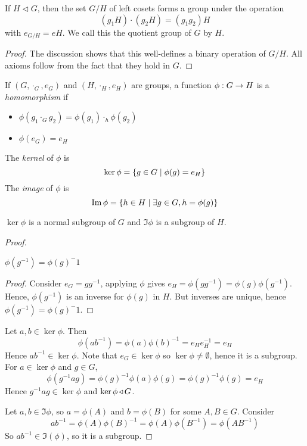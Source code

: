 \documentclass{article}
\begin{document}
\begin{prop}
    If $H \triangleleft G$, then the set $G / H$ of left cosets forms a group under the operation $$ (g_1H) \cdot (g_2H) = (g_1g_2) H $$ with $e_{G / H} = eH$.
    We call this the quotient group of $G$ by $H$.
\end{prop}
\begin{proof}
    The discussion shows that this well-defines a binary operation of $G / H$. All axioms follow from the fact that they hold in $G$.
\end{proof}

\begin{defi}
    If $(G, \cdot_G, e_G)$ and $(H, \cdot_H, e_H)$ are groups, a function ${\phi : G \rightarrow H}$ is a \emph{homomorphism} if 
    \begin{itemize}
        \item $\phi(g_1 \cdot_G g_2) = \phi(g_1) \cdot_h \phi(g_2)$
        \item $\phi(e_G) = e_H$
    \end{itemize}The \emph{kernel} of $\phi$ is $$ \ker \phi = \left\{ g \in G \mid \phi(g) = e_H \right\}$$
    The \emph{image} of $\phi$ is $$ \operatorname{Im} \phi = \left\{ h \in H \mid \exists g \in G, h = \phi(g)  \right\} $$
\end{defi}


\begin{lemma}
    $\ker \phi$ is a normal subgroup of $G$ and $\Im \phi$ is a subgroup of $H$.
\end{lemma}
\begin{proof}
    \begin{claim}
        $\phi(g^{-1}) = \phi(g)^-1$
        \begin{proof}
            Consider $e_G = gg^{-1}$, applying $\phi$ gives $e_H = \phi(gg^{-1}) = \phi(g)\phi(g^{-1})$.
            Hence, $\phi(g^{-1})$ is an inverse for $\phi(g)$ in $H$. But inverses are unique, hence $\phi(g^{-1}) = \phi(g)^-1$.
        \end{proof}
    \end{claim}
    Let $a, b \in \ker \phi$. Then $$ \phi(ab^{-1}) = \phi(a) \phi(b)^{-1} = e_H e_H^{-1} = e_H $$
    Hence $ab^{-1} \in \ker \phi$. Note that $e_G \in \ker \phi$ so $\ker \phi \neq \emptyset$, hence it is a subgroup. 
    For $a \in \ker \phi$ and $g \in G$, $$ \phi(g^{-1}ag) = \phi(g)^{-1} \phi(a) \phi(g) = \phi(g)^{-1}\phi(g) = e_H $$
    Hence $g^{-1}ag \in \ker \phi$ and $\ker \phi \operatorname{\triangleleft} G$.

    Let $a, b \in \Im \phi$, so $a = \phi(A)$ and $b = \phi(B)$ for some $A, B \in G$.
    Consider $$ab^{-1} = \phi(A)\phi(B)^{-1} = \phi(A)\phi(B^{-1}) = \phi(AB^{-1})$$
    So $ab^{-1} \in \Im(\phi)$, so it is a subgroup.
\end{proof}
\end{document}
